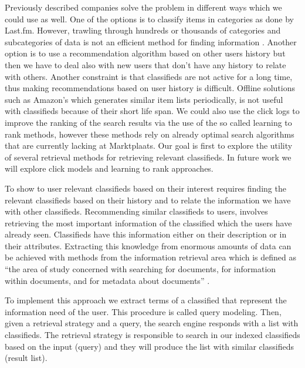 Previously described companies solve the problem in different ways which we could use as well. One of the options is to classify items in categories as done by Last.fm. However, trawling through hundreds or thousands of categories and subcategories of data is not an efficient method for finding information \cite{HatcherMcCandless}.  Another option is to use a recommendation algorithm based on other users history but then we have to deal also with new users that don't have any history to relate with others. Another constraint is that classifieds are not active for a long time, thus making recommendations based on user history is difficult. Offline solutions such as Amazon's which generates similar item lists periodically, is not useful with classifieds because of their short life span. We could also use the click logs to improve the ranking of the search results via the use of the so called learning to rank methods, however these methods rely on already optimal search algorithms that are currently lacking at Marktplaats. Our goal is first to explore the utility of several retrieval methods for retrieving relevant classifieds. In future work we will explore click models and learning to rank approaches.

To show to user relevant classifieds based on their interest requires finding the relevant classifieds based on their history and to relate the information we have with other classifieds. Recommending similar classifieds to users, involves retrieving the most important information of the classified which the users have already seen. Classifieds have this information either on their description or in their attributes. Extracting this knowledge from enormous amounts of data can be achieved with methods from the information retrieval area which is defined as ``the area of study concerned with searching for documents, for information within documents, and for metadata about documents'' \cite{SinghSingh}.

To implement this approach we extract terms of a classified that represent the information need of the user. This procedure is called query modeling. Then, given a retrieval strategy and a query, the search engine responds with a list with classifieds. The retrieval strategy is responsible to search in our indexed classifieds based on the input (query) and they will produce the list with similar classifieds (result list).

